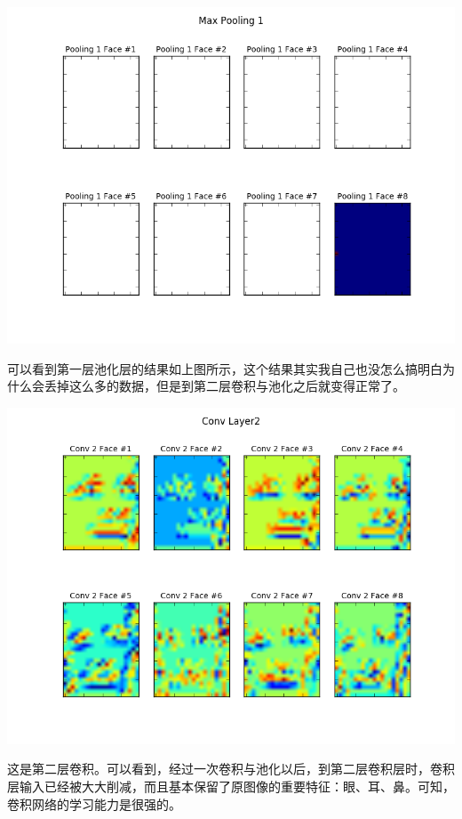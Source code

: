 \documentclass[12pt]{article}
\begin{document}
\begin{center}
\includegraphics[width=0.8\linewidth]{../image/pool1.png}\\
\end{center}

可以看到第一层池化层的结果如上图所示，这个结果其实我自己也没怎么搞明白为什么会丢掉这么多的数据，但是到第二层卷积与池化之后就变得正常了。\\

\begin{center}
\includegraphics[width=0.8\linewidth]{../image/conv2.png}
\end{center}

这是第二层卷积。可以看到，经过一次卷积与池化以后，到第二层卷积层时，卷积层输入已经被大大削减，而且基本保留了原图像的重要特征：眼、耳、鼻。可知，卷积网络的学习能力是很强的。\\
\end{document}
